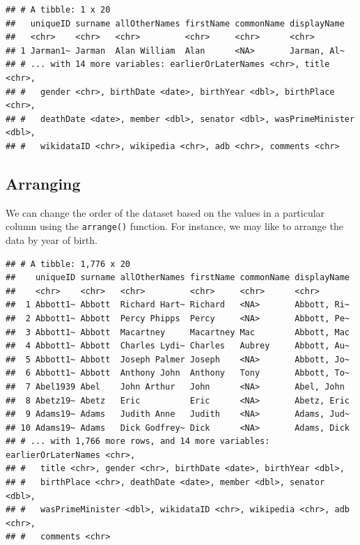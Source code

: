 \documentclass[
]{book}
\newenvironment{Shaded}{\begin{snugshade}}{\end{snugshade}}
\newcommand{\KeywordTok}[1]{\textcolor[rgb]{0.13,0.29,0.53}{\textbf{#1}}}
\newcommand{\NormalTok}[1]{#1}
\newcommand{\OperatorTok}[1]{\textcolor[rgb]{0.81,0.36,0.00}{\textbf{#1}}}
\newcommand{\StringTok}[1]{\textcolor[rgb]{0.31,0.60,0.02}{#1}}
\begin{document}
\begin{verbatim}
## # A tibble: 1 x 20
##   uniqueID surname allOtherNames firstName commonName displayName
##   <chr>    <chr>   <chr>         <chr>     <chr>      <chr>      
## 1 Jarman1~ Jarman  Alan William  Alan      <NA>       Jarman, Al~
## # ... with 14 more variables: earlierOrLaterNames <chr>, title <chr>,
## #   gender <chr>, birthDate <date>, birthYear <dbl>, birthPlace <chr>,
## #   deathDate <date>, member <dbl>, senator <dbl>, wasPrimeMinister <dbl>,
## #   wikidataID <chr>, wikipedia <chr>, adb <chr>, comments <chr>
\end{verbatim}

\hypertarget{arranging}{%
\subsection{Arranging}\label{arranging}}

We can change the order of the dataset based on the values in a particular column using the \texttt{arrange()} function. For instance, we may like to arrange the data by year of birth.

\begin{Shaded}
\end{Shaded}

\begin{verbatim}
## # A tibble: 1,776 x 20
##    uniqueID surname allOtherNames firstName commonName displayName
##    <chr>    <chr>   <chr>         <chr>     <chr>      <chr>      
##  1 Abbott1~ Abbott  Richard Hart~ Richard   <NA>       Abbott, Ri~
##  2 Abbott1~ Abbott  Percy Phipps  Percy     <NA>       Abbott, Pe~
##  3 Abbott1~ Abbott  Macartney     Macartney Mac        Abbott, Mac
##  4 Abbott1~ Abbott  Charles Lydi~ Charles   Aubrey     Abbott, Au~
##  5 Abbott1~ Abbott  Joseph Palmer Joseph    <NA>       Abbott, Jo~
##  6 Abbott1~ Abbott  Anthony John  Anthony   Tony       Abbott, To~
##  7 Abel1939 Abel    John Arthur   John      <NA>       Abel, John 
##  8 Abetz19~ Abetz   Eric          Eric      <NA>       Abetz, Eric
##  9 Adams19~ Adams   Judith Anne   Judith    <NA>       Adams, Jud~
## 10 Adams19~ Adams   Dick Godfrey~ Dick      <NA>       Adams, Dick
## # ... with 1,766 more rows, and 14 more variables: earlierOrLaterNames <chr>,
## #   title <chr>, gender <chr>, birthDate <date>, birthYear <dbl>,
## #   birthPlace <chr>, deathDate <date>, member <dbl>, senator <dbl>,
## #   wasPrimeMinister <dbl>, wikidataID <chr>, wikipedia <chr>, adb <chr>,
## #   comments <chr>
\end{verbatim}
\end{document}
